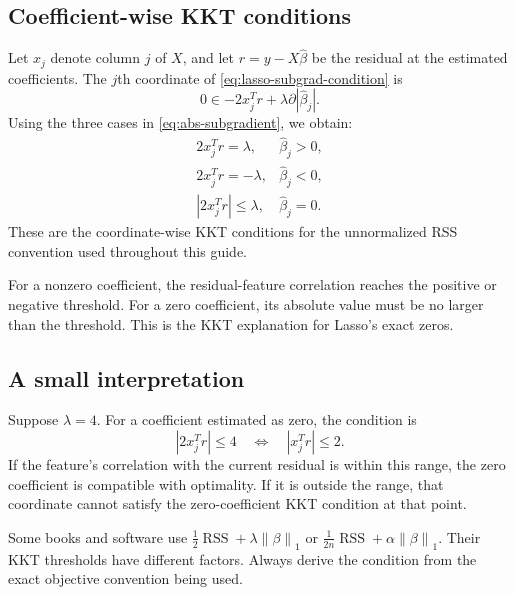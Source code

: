 \documentclass[11pt,a4paper]{article}
\numberwithin{equation}{section}
\newcommand{\norm}[1]{\left\lVert #1\right\rVert}
\newcommand{\abs}[1]{\left|#1\right|}
\newcommand{\RSS}{\operatorname{RSS}}
\begin{document}
\subsection{Coefficient-wise KKT conditions}
Let $x_j$ denote column $j$ of $X$, and let $r=y-X\hat\beta$ be the residual at the estimated coefficients. The $j$th coordinate of \cref{eq:lasso-subgrad-condition} is
\begin{equation}
  0\in -2x_j^Tr+\lambda\partial\abs{\hat\beta_j}.
\end{equation}
Using the three cases in \cref{eq:abs-subgradient}, we obtain:
\begin{equation}
  \boxed{\begin{array}{ll}
  2x_j^Tr=\lambda,&\hat\beta_j>0,\\[3pt]
  2x_j^Tr=-\lambda,&\hat\beta_j<0,\\[3pt]
  \abs{2x_j^Tr}\leq\lambda,&\hat\beta_j=0.
  \end{array}}
  \label{eq:kkt-piecewise}
\end{equation}
These are the coordinate-wise KKT conditions for the unnormalized RSS convention used throughout this guide.

\begin{keyidea}
For a nonzero coefficient, the residual-feature correlation reaches the positive or negative threshold. For a zero coefficient, its absolute value must be no larger than the threshold. This is the KKT explanation for Lasso's exact zeros.
\end{keyidea}

\subsection{A small interpretation}
Suppose $\lambda=4$. For a coefficient estimated as zero, the condition is
\begin{equation}
  \abs{2x_j^Tr}\leq4\quad\Longleftrightarrow\quad\abs{x_j^Tr}\leq2.
\end{equation}
If the feature's correlation with the current residual is within this range, the zero coefficient is compatible with optimality. If it is outside the range, that coordinate cannot satisfy the zero-coefficient KKT condition at that point.

\begin{warningbox}
Some books and software use $\frac{1}{2}\RSS+\lambda\norm{\beta}_1$ or $\frac{1}{2n}\RSS+\alpha\norm{\beta}_1$. Their KKT thresholds have different factors. Always derive the condition from the exact objective convention being used.
\end{warningbox}
\end{document}
